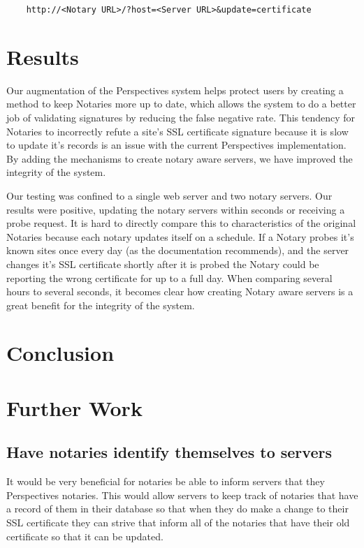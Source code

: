 \documentclass[preprint,review,12pt]{elsarticle}
\begin{document}
\begin{verbatim}
    http://<Notary URL>/?host=<Server URL>&update=certificate
\end{verbatim}

\section{Results}
\label{results}

Our augmentation of the Perspectives system helps protect users by creating a
method to keep Notaries more up to date, which allows the system to do a better
job of validating signatures by reducing the false negative rate. This tendency
for Notaries to incorrectly refute a site's SSL certificate signature because
it is slow to update it's records is an issue with the current Perspectives
implementation. By adding the mechanisms to create notary aware servers, we
have improved the integrity of the system.

Our testing was confined to a single web server and two notary servers. Our
results were positive, updating the notary servers within seconds or receiving
a probe request. It is hard to directly compare this to characteristics of the
original Notaries because each notary updates itself on a schedule. If a Notary
probes it's known sites once every day (as the documentation recommends), and
the server changes it's SSL certificate shortly after it is probed the Notary
could be reporting the wrong certificate for up to a full day. When comparing
several hours to several seconds, it becomes clear how creating Notary aware
servers is a great benefit for the integrity of the system.

\section{Conclusion}
\label{conclusion}

\section{Further Work}
\label{further work}

\subsection{Have notaries identify themselves to servers}

It would be very beneficial for notaries be able to inform servers that they
Perspectives notaries. This would allow servers to keep track of notaries
that have a record of them in their database so that when they do make a
change to their SSL certificate they can strive that inform all of the
notaries that have their old certificate so that it can be updated.
\end{document}
